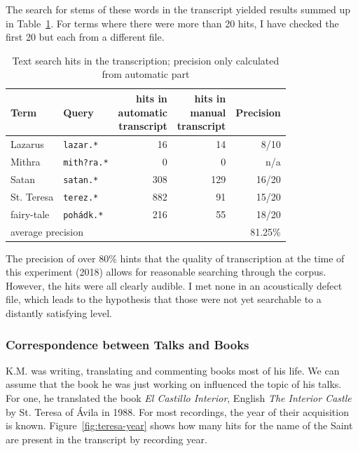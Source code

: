 \documentclass[12pt,a4paper]{report}
\begin{document}
The search for stems of these words in the transcript
yielded results summed up in Table~\ref{tab:topicsearch}. For terms where there
were more than 20 hits, I have checked the first 20 but each from a different
file.

\begin{table}[htpb]
\begin{center}
\begin{tabular}{|l|l|r|r|r|}
\hline
Term &
Query &
\makecell{hits in\\automatic\\
transcript} &
\makecell{hits in\\manual\\
transcript} &
Precision \\
\hline
Lazarus & \texttt{lazar.*} & 16  & 14 & 8/10   \\
Mithra & \texttt{mith?ra.*} & 0  & 0 & n/a   \\
Satan & \texttt{satan.*} & 308  & 129 & 16/20   \\
St. Teresa & \texttt{terez.*} & 882  & 91 & 15/20   \\
fairy-tale & \texttt{pohádk.*} & 216  & 55 & 18/20   \\
\hline
\multicolumn{4}{|l|}{average precision} & 81.25\%\\
\hline
\end{tabular}
\caption{Text search hits in the transcription; precision only calculated from
automatic part}\label{tab:topicsearch}
\end{center}
\end{table}

The precision of over 80\% hints that the
quality of transcription at the time of this experiment (2018) allows for reasonable searching through the corpus.
However, the hits were all clearly audible. I met none in an acoustically defect
file, which leads to the hypothesis that those were not yet searchable to a
distantly satisfying level.

\subsubsection{Correspondence between Talks and Books}

K.M. was writing, translating and commenting books most of his life. We can
assume that the book he was just working on influenced the topic of his talks. 
For one, he translated the book \emph{El Castillo Interior}, English \emph{The
Interior Castle} by St. Teresa of Ávila in 1988. For most recordings, the year
of their acquisition is known.  Figure~\ref{fig:teresa-year} shows how many hits
for the name of the Saint are present in the transcript by recording year.
\end{document}
